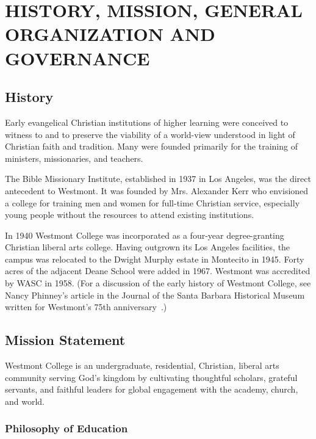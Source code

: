\section{HISTORY, MISSION, GENERAL ORGANIZATION
		AND GOVERNANCE}
	\label{sec:HMGOG}
	\subsection{History}
		Early evangelical Christian institutions of higher learning were conceived to
		witness to and to preserve the viability of a world-view understood in light of
		Christian faith and tradition. Many were founded primarily for the training of
		ministers, missionaries, and teachers.

		The Bible Missionary Institute, established in 1937 in Los Angeles, was the
		direct antecedent to Westmont. It was founded by Mrs. Alexander Kerr who
		envisioned a college for training men and women for full-time Christian service,
		especially young people without the resources to attend existing institutions.

		In 1940 Westmont College was incorporated as a four-year degree-granting
		Christian liberal arts college. Having outgrown its Los Angeles facilities, the
		campus was relocated to the Dwight Murphy estate in Montecito in 1945.  Forty
		acres of the adjacent Deane School were added in 1967. Westmont was accredited
		by WASC in 1958. (For a discussion of the early history of Westmont College, see
		Nancy Phinney's article in the
		Journal of the Santa Barbara Historical Museum
		written for Westmont's 75th anniversary~\cite{Phinney2012}.)

	\subsection{Mission Statement}

		Westmont College is an undergraduate, residential, Christian, liberal arts
		community serving God's kingdom by cultivating thoughtful scholars, grateful
		servants, and faithful leaders for global engagement with the academy, church,
		and world.

		\subsubsection{Philosophy of Education}

